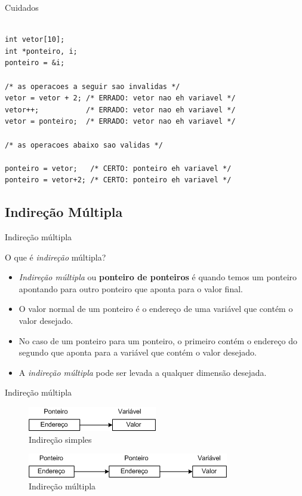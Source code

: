 \begin{frame}{Cuidados}  

\begin{verbatim}

int vetor[10];
int *ponteiro, i;
ponteiro = &i;

/* as operacoes a seguir sao invalidas */
vetor = vetor + 2; /* ERRADO: vetor nao eh variavel */
vetor++;           /* ERRADO: vetor nao eh variavel */
vetor = ponteiro;  /* ERRADO: vetor nao eh variavel */

/* as operacoes abaixo sao validas */

ponteiro = vetor;   /* CERTO: ponteiro eh variavel */
ponteiro = vetor+2; /* CERTO: ponteiro eh variavel */
\end{verbatim}


\end{frame}


\subsection{Indireção Múltipla}
\begin{frame}[c]{Indireção múltipla}
\begin{block}{O que é \textit{indireção} múltipla?}
  \begin{itemize}[<+->]
    \item \textit{Indireção múltipla} ou \textbf{ponteiro de ponteiros} é quando temos um ponteiro apontando para outro ponteiro que aponta para o valor final.
    \item O valor normal de um ponteiro é o endereço de uma variável que contém o valor desejado.
    \item No caso de um ponteiro para um ponteiro, o primeiro contém o endereço do segundo que aponta para a variável que contém o valor desejado.
    \item A \textit{indireção múltipla} pode ser levada a qualquer dimensão desejada. 
  \end{itemize}
\end{block}    
\end{frame}

\begin{frame}[c]{Indireção múltipla}
  \begin{figure}[ht]
    \centering
    \includegraphics[width=.6\textwidth]{figs/fig_ponteiros/indirecao-simples} 
    \caption{Indireção simples}
  \end{figure}
            
  \begin{figure}[ht]
    \centering
    \includegraphics[width=.6\textwidth]{figs/fig_ponteiros/indirecao-multipla}
    \caption{Indireção múltipla}
  \end{figure}
\end{frame}

